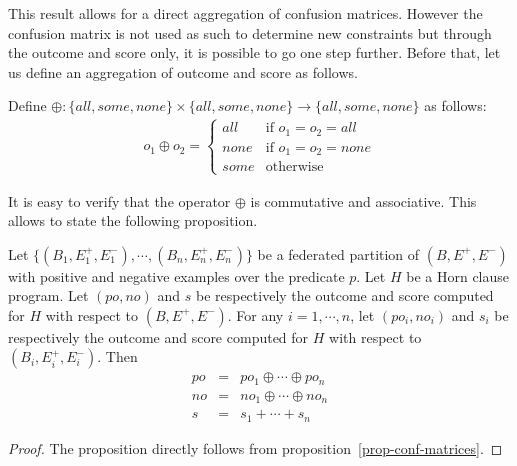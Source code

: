 This result allows for a direct aggregation of confusion matrices. However the confusion matrix is not used as such to determine new constraints but through the outcome and score only, it is possible to go one step further. Before that, let us define an aggregation of outcome and score as follows.

\begin{definition}
Define 
\(\oplus : \{ \mathit{all}, \mathit{some}, \mathit{none} \}
              \times 
              \{ \mathit{all}, \mathit{some}, \mathit{none} \}
              \rightarrow
              \{ \mathit{all}, \mathit{some}, \mathit{none} \}
\)
as follows:
\begin{eqnarray*}
    o_1 \oplus o_2 = \left\{\begin{array}{ll}
                             \mathit{all} & \mbox{if } o_1 = o_2 = \mathit{all} \\
                             \mathit{none} & \mbox{if } o_1 = o_2 = \mathit{none} \\
                             \mathit{some} & \mbox{otherwise}
                           \end{array}
                     \right.
\end{eqnarray*}
\end{definition}

It is easy to verify that the operator $\oplus$ is commutative and associative. This allows to state the following proposition.

\begin{proposition}
\label{prop-agg}
Let \( \{ (B_1, E_1^+,E_1^-), \cdots, (B_n, E_n^+,E_n^-) \}
\)
be a federated partition of $(B, E^+,E^-)$ with positive and negative examples over the predicate $p$. Let $H$ be a Horn clause program. Let 
$(po,no)$ and $s$ be respectively the outcome and score computed for $H$ with respect to $(B, E^+,E^-)$. For any $i=1, \cdots, n$, let $(po_i,no_i)$ and $s_i$ be respectively the outcome and score computed for $H$ with respect to $(B_i, E_i^+,E_i^-)$. Then 
\begin{eqnarray*}
    po & = & po_1 \oplus \cdots \oplus po_n \\
    no & = & no_1 \oplus \cdots \oplus no_n \\
    s  & = & s_1 + \cdots + s_n
\end{eqnarray*} 
\end{proposition}

\begin{proof}
The proposition directly follows from proposition~\ref{prop-conf-matrices}.
\end{proof}

